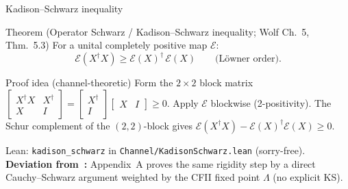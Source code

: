 \documentclass[aspectratio=169,10pt]{beamer}
\newcommand{\cE}{\mathcal{E}}
\begin{document}
\begin{frame}{Kadison--Schwarz inequality~\cite{Wolf2012Quantum}}
    \vspace{-0.6em}

    \begin{block}{Theorem (Operator Schwarz / Kadison--Schwarz inequality; Wolf Ch.~5, Thm.~5.3)}
        For a unital completely positive map $\cE$:
        \[
            \cE(X^\dagger X) \ge  \cE(X)^\dagger\,\cE(X)
            \qquad \text{(L\"{o}wner order)}.
        \]
    \end{block}

    \begin{block}{Proof idea (channel-theoretic)}
        Form the $2\times 2$ block matrix
        $[\begin{smallmatrix} X^\dagger X & X^\dagger \\ X & I \end{smallmatrix}] =
            [\begin{smallmatrix} X^\dagger \\ I \end{smallmatrix}]
            [\begin{smallmatrix} X & I \end{smallmatrix}] \ge 0$.
        Apply $\cE$ blockwise (2-positivity). The Schur complement of the $(2,2)$-block
        gives $\cE(X^\dagger X) - \cE(X)^\dagger \cE(X) \ge 0$.
    \end{block}

    \textcolor{dimwhite}{\footnotesize Lean: \texttt{kadison\_schwarz} in \texttt{Channel/KadisonSchwarz.lean} (sorry-free).\\
        \textbf{Deviation from~\cite{Cirac2017Annals}:} Appendix~A proves the same rigidity step by a direct Cauchy--Schwarz argument weighted by the CFII fixed point $\Lambda$ (no explicit KS).}
\end{frame}
\end{document}
